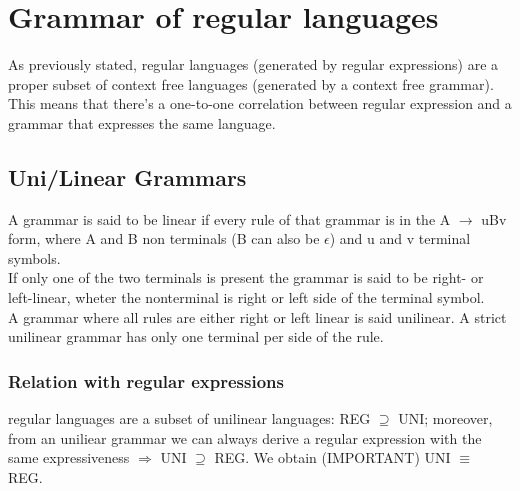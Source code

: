 	\section{Grammar of regular languages}
		As previously stated, regular languages (generated by regular expressions) are a proper subset of context free languages (generated by a context free grammar). This means that there's a one-to-one correlation between regular expression and a grammar that expresses the same language. 
		\subsection{Uni/Linear Grammars}
		\label{sec:uni_linear_grammars}
			A grammar is said to be linear if every rule of that grammar is in the A $\rightarrow$ uBv form, where A and B non terminals (B can also be $\epsilon$) and u and v terminal symbols.\\
			If only one of the two terminals is present the grammar is said to be right- or left-linear, wheter the nonterminal is right or left side of the terminal symbol.\\
			A grammar where all rules are either right or left linear is said unilinear. A strict unilinear grammar has only one terminal per side of the rule.\\
			\subsubsection{Relation with regular expressions} regular languages are a subset of unilinear languages: REG $\supseteq$ UNI; moreover, from an uniliear grammar we can always derive a regular expression with the same expressiveness $\Rightarrow$ UNI $\supseteq$ REG. We obtain (IMPORTANT) UNI $\equiv$ REG.